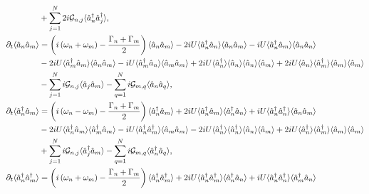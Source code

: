 \begin{align}
&+ \sum_{j=1}^N 2 i \mathcal{G}_{n, j} \langle\hat{a}_n^\dagger\hat{a}_j^\dagger\rangle, \notag \\
%
%
\partial_t\langle\hat{a}_n\hat{a}_m\rangle &= \left(i\left(\omega_n + \omega_m\right) - \frac{\Gamma_n + \Gamma_m}{2}\right)\langle\hat{a}_n\hat{a}_m\rangle - 2 i U \langle\hat{a}_n^\dagger\hat{a}_n\rangle \langle\hat{a}_n\hat{a}_m\rangle - i U \langle\hat{a}_n^\dagger\hat{a}_m\rangle \langle\hat{a}_n\hat{a}_n\rangle \notag \\
& - 2 i U \langle\hat{a}_m^\dagger\hat{a}_m\rangle\langle\hat{a}_n\hat{a}_m\rangle - i U \langle\hat{a}_m^\dagger\hat{a}_n\rangle\langle\hat{a}_m\hat{a}_m\rangle + 2 i U \langle\hat{a}_n^\dagger\rangle \langle\hat{a}_n\rangle \langle\hat{a}_n\rangle \langle\hat{a}_m\rangle + 2 i U \langle\hat{a}_n\rangle \langle\hat{a}_m^\dagger\rangle \langle\hat{a}_m\rangle\langle\hat{a}_m\rangle \notag \\
& - \sum_{j=1}^N i \mathcal{G}_{n, j}\langle\hat{a}_j\hat{a}_m\rangle - \sum_{q=1}^N i \mathcal{G}_{m, q} \langle\hat{a}_n\hat{a}_q\rangle, \notag \\
%
%
\partial_t\langle\hat{a}_n^\dagger\hat{a}_m\rangle &= \left(i\left(\omega_n - \omega_m\right) - \frac{\Gamma_n + \Gamma_m}{2}\right)\langle\hat{a}_n^\dagger\hat{a}_m\rangle + 2 i U \langle\hat{a}_n^\dagger\hat{a}_m \rangle \langle\hat{a}_n^\dagger \hat{a}_n\rangle + i U \langle \hat{a}_n^\dagger \hat{a}_n^\dagger\rangle\langle\hat{a}_n\hat{a}_m\rangle \notag \\
& - 2 i U \langle\hat{a}_n^\dagger \hat{a}_m \rangle \langle \hat{a}_m^\dagger \hat{a}_m\rangle - i U \langle\hat{a}_n^\dagger \hat{a}_m^\dagger\rangle \langle\hat{a}_m\hat{a}_m\rangle - 2 i U \langle\hat{a}_n^\dagger\rangle \langle\hat{a}_n^\dagger\rangle \langle\hat{a}_n\rangle \langle\hat{a}_m\rangle + 2 i U \langle\hat{a}_n^\dagger \rangle \langle \hat{a}_m^\dagger \rangle \langle \hat{a}_m\rangle \langle\hat{a}_m\rangle \notag \\
& + \sum_{j=1}^N i \mathcal{G}_{n, j}\langle\hat{a}_j^\dagger\hat{a}_m\rangle - \sum_{q=1}^N i \mathcal{G}_{m, q}\langle \hat{a}_n^\dagger \hat{a}_q\rangle,  \notag \\
%
%
\partial_t\langle\hat{a}_n^\dagger\hat{a}_m^\dagger\rangle &= \left(i \left(\omega_n + \omega_m\right) - \frac{\Gamma_n + \Gamma_m}{2}\right) \langle \hat{a}_n^\dagger \hat{a}_m^\dagger\rangle + 2 i U \langle\hat{a}_n^\dagger \hat{a}_m^\dagger\rangle \langle \hat{a}_n^\dagger \hat{a}_n\rangle + i U \langle \hat{a}_n^\dagger \hat{a}_n^\dagger \rangle \langle \hat{a}_m^\dagger \hat{a}_n\rangle \notag \\

\end{align}
